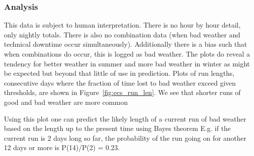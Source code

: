 {{\subsubsection{Analysis}
This data is subject to human interpretation. There is no hour by hour detail, only nightly totals. There is also no combination data (when bad weather and technical downtime occur simultaneously). Additionally there is a bias such that when combinations do occur, this is logged as bad weather. The plots do reveal a tendency for better weather in summer and more bad weather in winter as might be expected but beyond that little of use in prediction. Plots of run lengths, consecutive days where the  fraction of time lost to bad weather exceed given thresholds, are shown in Figure~\ref{fig:ecs_run_len}. We see that shorter runs of good and bad weather are more common 

Using this plot one can predict the likely length of a current run of bad weather based on the length up to the present time using Bayes theorem E.g. if the current run is 2 days long so far, the probability of the run going on for another 12 days or more is P(14)/P(2) = 0.23.


}}
